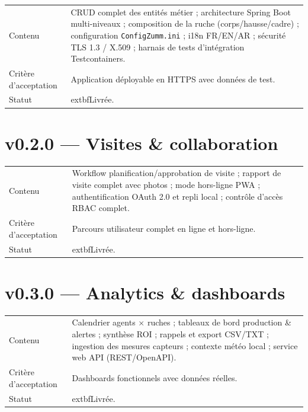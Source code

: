 \begin{center}
\begin{tabular}{lp{11cm}}
\toprule
Contenu &
  CRUD complet des entités métier ;
  architecture Spring Boot multi-niveaux ;
  composition de la ruche (corps/hausse/cadre) ;
  configuration \texttt{ConfigZumm.ini} ;
  i18n FR/EN/AR ;
  sécurité TLS 1.3 / X.509 ;
  harnais de tests d'intégration Testcontainers. \\
Critère d'acceptation & Application déployable en HTTPS avec données de test. \\
Statut & 	extbf{Livrée}. \\
\bottomrule
\end{tabular}
\end{center}

\section{v0.2.0 --- Visites \& collaboration}

\begin{center}
\begin{tabular}{lp{11cm}}
\toprule
Contenu &
  Workflow planification/approbation de visite ;
  rapport de visite complet avec photos ;
  mode hors-ligne PWA ;
  authentification OAuth 2.0 et repli local ;
  contrôle d'accès RBAC complet. \\
Critère d'acceptation & Parcours utilisateur complet en ligne et hors-ligne. \\
Statut & 	extbf{Livrée}. \\
\bottomrule
\end{tabular}
\end{center}

\section{v0.3.0 --- Analytics \& dashboards}

\begin{center}
\begin{tabular}{lp{11cm}}
\toprule
Contenu &
  Calendrier agents $\times$ ruches ;
  tableaux de bord production \& alertes ;
  synthèse ROI ;
  rappels et export CSV/TXT ;
  ingestion des mesures capteurs ;
  contexte météo local ;
  service web API (REST/OpenAPI). \\
Critère d'acceptation & Dashboards fonctionnels avec données réelles. \\
Statut & 	extbf{Livrée}. \\
\bottomrule
\end{tabular}
\end{center}

